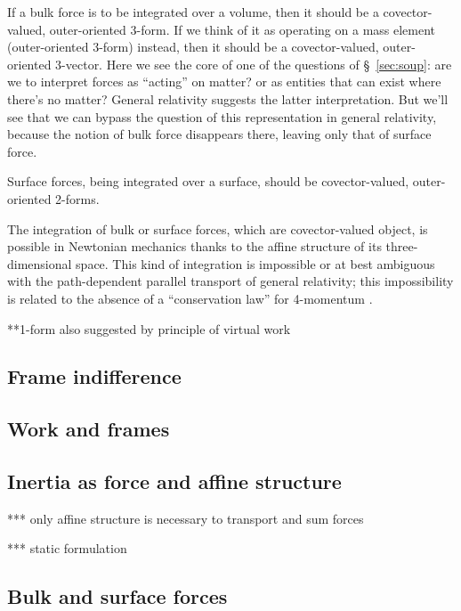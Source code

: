 \documentclass[\ifafour a4paper,12pt,\else a5paper,10pt,\fi%
onecolumn,oneside,article,%
british%
]{memoir}
\theoremstyle{remark}
\theoremstyle{innote}
\newcommand*{\citep}{\parencites}
\renewcommand*{\cites}{\parencites}
\renewcommand*{\|}{\nonscript\,\vert\nonscript\;\mathopen{}}
\newcommand*{\sect}{\S}%
\newcommand*{\cf}{{cf.}}
\begin{document}
If a bulk force is to be integrated over a volume, then it should be a
covector-valued, outer-oriented 3-form. If we think of it as operating on a
mass element (outer-oriented 3-form) instead, then it should be a
covector-valued, outer-oriented 3-vector. Here we see the core of one of
the questions of \sect~\ref{sec:soup}: are we to interpret forces as
\enquote{acting} on matter? or as entities that can exist where there's no
matter? General relativity suggests the latter interpretation. But we'll
see that we can bypass the question of this representation in general
relativity, because the notion of bulk force disappears there, leaving only
that of surface force.

Surface forces, being integrated over a surface, should be covector-valued,
outer-oriented 2-forms.

The integration of bulk or surface forces, which are covector-valued
object, is possible in Newtonian mechanics thanks to the affine structure of
its three-dimensional space. This kind of integration is impossible or
at best ambiguous with the path-dependent parallel transport of general
relativity; this impossibility is related to the absence of a
\enquote{conservation law} for 4-momentum \cites[\sect~21]{pauli1921_t1958}[\sect~59]{eddington1923_r1930}[\sect~96]{landauetal1939_t1994}[also][]{aldermanetal1970}.


**1-form also suggested by principle of virtual work

\subsection{Frame indifference}
\label{sec:frame_indifference}


\subsection{Work and frames}
\label{sec:work_frames}


\subsection{Inertia as force and affine structure}
\label{sec:inertia_is_force}

*** only affine structure is necessary to transport and sum forces

*** static formulation  \citep[\cf][\sect~6, p.~652]{vandantzig1934d}

\subsection{Bulk and surface forces}
\label{sec:surface_forces}
\end{document}

